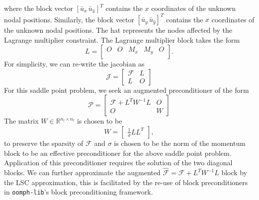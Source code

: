 \renewcommand{\arraystretch}{1}
where the block vector $[\bar{u}_x \, \bar{u}_{\hat{x}}]^T$ contains the $x$
coordinates of the unknown nodal positions. Similarly, the block vector
$[\bar{u}_y \, \bar{u}_{\hat{y}}]^T$ contains the $x$ coordinates of the
unknown nodal positions. The hat represents the nodes affected by the Lagrange
multiplier constraint. The Lagrange multiplier block takes the form
\begin{equation*}
	L =
\begin{bmatrix}
 O & O & M_x & M_y & O \\
\end{bmatrix}.
\end{equation*}
For simplicity, we can re-write the jacobian as
\begin{equation*}
	\mathcal{J} = 
	\begin{bmatrix}
	 \mathcal{F} & L\\
	L & \mathit{O}
	\end{bmatrix}
\end{equation*}
For this saddle point problem, we seek an augmented preconditioner of the form
\begin{equation*}
	\mathcal{P} = 
	\begin{bmatrix}
	 \mathcal{F}+ L^T W^{-1} L & \mathit{O}\\
	\mathit{O} & W
	\end{bmatrix}
\end{equation*}
The matrix $W\in \mathbb{R}^{n_l \times n_l}$ is chosen to be
 \begin{equation}
 	W = 
 	\begin{bmatrix}
 	\frac{1}{\sigma}L L^T
 	\end{bmatrix},
 	\label{eq:W}
 \end{equation}
to preserve the sparsity of $\mathcal{F}$ and $\sigma$ is chosen to be the norm
of the momentum block to be an effective preconditioner for the above saddle
point problem. Application of this preconditioner requires the solution of the
two diagonal blocks. We can further approximate the augmented
$\hat{\mathcal{F}} = \mathcal{F} + L^TW^{-1}L$ block by the LSC approximation,
this is facilitated by the re-use of block preconditioners in
\verb+oomph-lib+'s block preconditioning framework.
%
